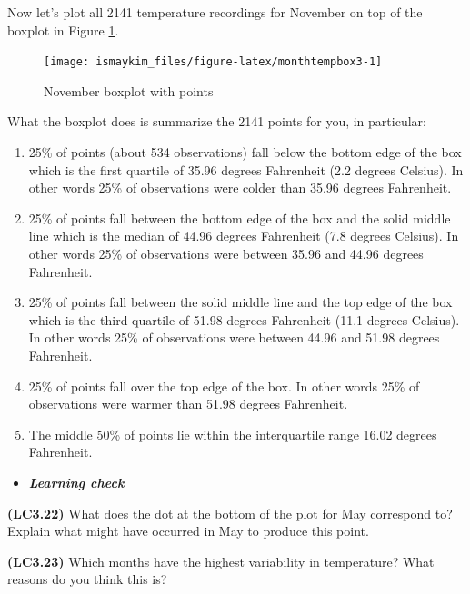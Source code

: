 \documentclass[12pt,]{krantz}
\providecommand{\tightlist}{%
  \setlength{\itemsep}{0pt}\setlength{\parskip}{0pt}}
\newenvironment{rmdblock}[1]
  {\begin{shaded*}
  \begin{itemize}
  \renewcommand{\labelitemi}{
    \raisebox{-.7\height}[0pt][0pt]{
    }
  }
  \item
  }
  {
  \end{itemize}
  \end{shaded*}
  }
\newenvironment{learncheck}
  {\begin{rmdblock}{warning}}
  {\end{rmdblock}}
\theoremstyle{definition}
\theoremstyle{definition}
\theoremstyle{definition}
\theoremstyle{remark}
\begin{document}
Now let's plot all 2141 temperature recordings for November on top of
the boxplot in Figure \ref{fig:monthtempbox3}.

\begin{figure}

{\centering \texttt{[image: ismaykim\_files/figure-latex/monthtempbox3-1]} 

}

\caption{November boxplot with points}\label{fig:monthtempbox3}
\end{figure}

What the boxplot does is summarize the 2141 points for you, in
particular:

\begin{enumerate}
\def\labelenumi{\arabic{enumi}.}
\tightlist
\item
  25\% of points (about 534 observations) fall below the bottom edge of
  the box which is the first quartile of 35.96 degrees Fahrenheit (2.2
  degrees Celsius). In other words 25\% of observations were colder than
  35.96 degrees Fahrenheit.
\item
  25\% of points fall between the bottom edge of the box and the solid
  middle line which is the median of 44.96 degrees Fahrenheit (7.8
  degrees Celsius). In other words 25\% of observations were between
  35.96 and 44.96 degrees Fahrenheit.
\item
  25\% of points fall between the solid middle line and the top edge of
  the box which is the third quartile of 51.98 degrees Fahrenheit (11.1
  degrees Celsius). In other words 25\% of observations were between
  44.96 and 51.98 degrees Fahrenheit.
\item
  25\% of points fall over the top edge of the box. In other words 25\%
  of observations were warmer than 51.98 degrees Fahrenheit.
\item
  The middle 50\% of points lie within the interquartile range 16.02
  degrees Fahrenheit.
\end{enumerate}

\begin{learncheck}
\textbf{\emph{Learning check}}
\end{learncheck}

\textbf{(LC3.22)} What does the dot at the bottom of the plot for May
correspond to? Explain what might have occurred in May to produce this
point.

\textbf{(LC3.23)} Which months have the highest variability in
temperature? What reasons do you think this is?
\end{document}
